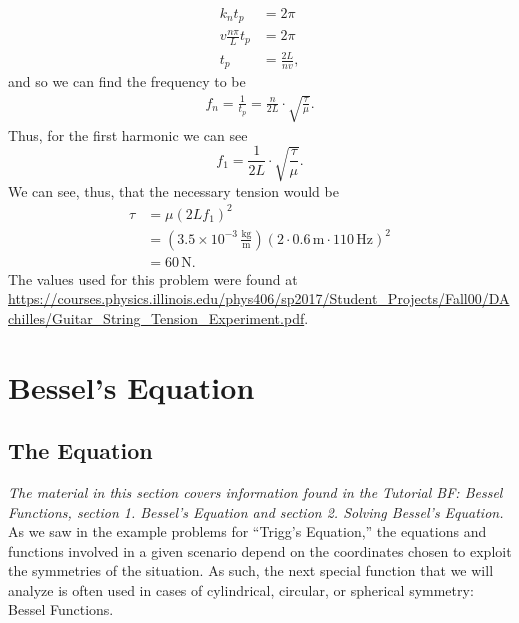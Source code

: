 \documentclass[11pt]{report}
\newcommand{\fpar}[1]{\left({#1}\right)}
\begin{document}
    \begin{align*}
        k_n t_p &= 2\pi\\
        v\frac{n\pi}{L}t_p &= 2\pi\\
        t_p &= \frac{2L}{nv},
    \end{align*}
and so we can find the frequency to be
    \begin{align*}
        f_n = \frac{1}{t_p} = \frac{n}{2L}\cdot\sqrt{\frac{\tau}{\mu}}.
    \end{align*}
Thus, for the first harmonic we can see
    \begin{equation*}
        f_1 =  \frac{1}{2L}\cdot\sqrt{\frac{\tau}{\mu}}.
    \end{equation*}
We can see, thus, that the necessary tension would be
    \begin{align*}
        \tau &= \mu\fpar{2Lf_1}^2\\
             &= \fpar{3.5\times10^{-3} \,\frac{\text{kg}}{\text{m}}}\fpar{2\cdot0.6\,\text{m}\cdot110\,\text{Hz}}^2\\
             &= 60\,\text{N}.
    \end{align*}
The values used for this problem were found at \url{ https://courses.physics.illinois.edu/phys406/sp2017/Student_Projects/Fall00/DAchilles/Guitar_String_Tension_Experiment.pdf}.


\chapter{Bessel’s Equation}




\section{The Equation}

\emph{The material in this section covers information found in the Tutorial BF: Bessel Functions, section 1. Bessel’s Equation and section 2. Solving Bessel’s Equation.}\\

As we saw in the example problems for ``Trigg's Equation,'' the equations and functions involved in a given scenario depend on the coordinates chosen to exploit the symmetries of the situation. As such, the next special function that we will analyze is often used in cases of cylindrical, circular, or spherical symmetry: Bessel Functions.\\
\end{document}

